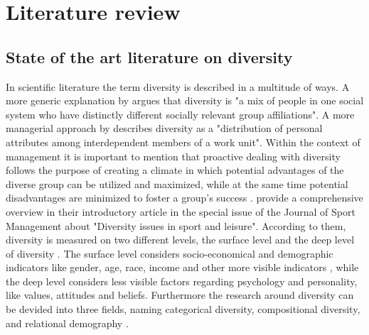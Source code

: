\documentclass[	
	12pt, %
	a4paper, %
]{scrartcl}\usepackage[]{graphicx}\usepackage[]{color}
\begin{document}
\section{Literature review}
\label{sec:literature}

\subsection{State of the art literature on diversity}

In scientific literature the term diversity is described in a multitude of ways. A more generic explanation by  argues that diversity is "a mix of people in one social system who have distinctly different socially relevant group affiliations". A more managerial approach by  describes diversity as a "distribution of personal attributes among interdependent members of a work unit". Within the context of management it is important to mention that proactive dealing with diversity follows the purpose of creating a climate in which potential advantages of the diverse group can be utilized and maximized, while at the same time potential disadvantages are minimized to foster a group's success \cite{Cox1997}.  provide a comprehensive overview in their introductory article in the special issue of the Journal of Sport Management about "Diversity issues in sport and leisure". According to them, diversity is measured on two different levels, the surface level and the deep level of diversity \cite{Cunningham2006}. The surface level considers socio-economical and demographic indicators like gender, age, race, income and other more visible indicators \cite{Fink2001, Siciliano1996}, while the deep level considers less visible factors regarding psychology and personality, like values, attitudes and beliefs.
Furthermore the research around diversity can be devided into three fields, naming categorical diversity, compositional diversity, and relational demography \cite{Cunningham2006, Tsui1999}. %
\end{document}
